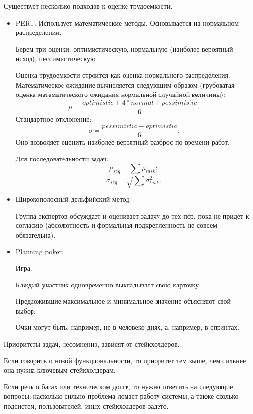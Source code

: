     \begin{Rem}
        Существует несколько подходов к оценке трудоемкости.
        \begin{itemize}
            \item PERT. Использует математические методы. Основывается на нормальном распределении.

            Берем три оценки: оптимистическую, нормальную (наиболее вероятный исход), пессимистическую.

            Оценка трудоемкости строится как оценка нормального распределения. Математическое ожидание вычисляется следующим образом (грубоватая оценка математического ожидания нормальной случайной величины): $$\mu = \frac{optimistic + 4 * normal + pessimistic}{6}.$$
            Стандартное отклонение: $$\sigma = \frac{pessimistic - optimistic}{6}.$$ Оно позволяет оценить наиболее вероятный разброс по времени работ.

            Для последовательности задач:
            $$\mu_{seq} = \sum \mu_{task};$$
            $$\sigma_{seq} = \sqrt{\sum \sigma_{task}^2}.$$

            \item Широкополосный дельфийский метод. 

            Группа экспертов обсуждает и оценивает задачу до тех пор, пока не придет к согласию (абсолютность и формальная подкрепленность не совсем обязательна).

            \item Planning poker.

            Игра.

            Каждый участник одновременно выкладывает свою карточку.

            Предложившие максимальное и минимальное значение объясняют свой выбор.

            Очки могут быть, например, не в человеко-днях, а, например, в спринтах.
        \end{itemize}
    \end{Rem}


    \begin{Rem}
        Приоритеты задач, несомненно, зависят от стейкхолдеров.

        Если говорить о новой функциональности, то приоритет тем выше, чем сильнее она нужна ключевым стейкхолдерам.

        Если речь о багах или техническом долге, то нужно ответить на следующие вопросы: насколько сильно проблема ломает работу системы, а также сколько подсистем, пользователей, иных стейкхолдеров задето.
    \end{Rem}

